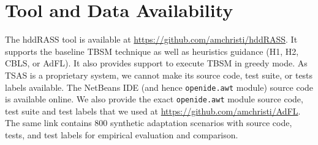 \section{Tool and Data Availability}
The hddRASS tool is available at \url{https://github.com/amchristi/hddRASS}. It supports the baseline TBSM technique as well as heuristics guidance (H1, H2, CBLS, or AdFL). It also provides support to execute TBSM in greedy mode. As TSAS is a proprietary system, we cannot make its source code, test suite, or tests labels available. The NetBeans IDE (and hence \texttt{openide.awt} module) source code is available online. We also  provide the exact \texttt{openide.awt} module source code, test suite and test labels that we used at \url{https://github.com/amchristi/AdFL}. The same link contains 800 synthetic adaptation scenarios with source code, tests, and test labels for empirical evaluation and comparison. 


